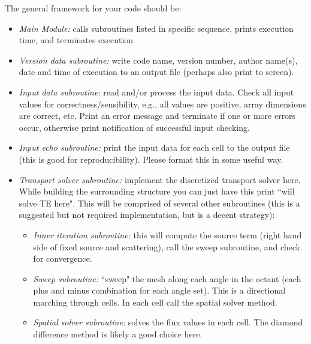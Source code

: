 \documentclass[12pt]{article}
\begin{document}
The general framework for your code should be:
\begin{itemize}
\item \textit{Main Module:} calls subroutines listed in specific sequence, prints execution time, and terminates execution

\item \textit{Version data subroutine:} write code name, version number, author name(s), date and time of execution to an output file (perhaps also print to screen).

\item \textit{Input data subroutine:} read and/or process the input data. Check all input values for correctness/sensibility, e.g., all values are positive, array dimensions are correct, etc. Print an error message and terminate if one or more errors occur, otherwise print notification of successful input checking. 

\item \textit{Input echo subroutine:} print the input data for each cell to the output file (this is good for reproducibility). Please format this in some useful way.

\item \textit{Transport solver subroutine:} implement the discretized transport solver here. While building the surrounding structure you can just have this print ``will solve TE here". This will be comprised of several other subroutines (this is a suggested but not required implementation, but is a decent strategy):

\begin{itemize}
\item \textit{Inner iteration subroutine:} this will compute the source term (right hand side of fixed source and scattering), call the sweep subroutine, and check for convergence.

\item \textit{Sweep subroutine:} ``sweep" the mesh along each angle in the octant (each plus and minus combination for each angle set). This is a directional marching through cells. In each cell call the spatial solver method.

\item \textit{Spatial solver subroutine:} solves the flux values in each cell. The diamond difference method is likely a good choice here.
\end{itemize}

\end{itemize}

\end{document}
